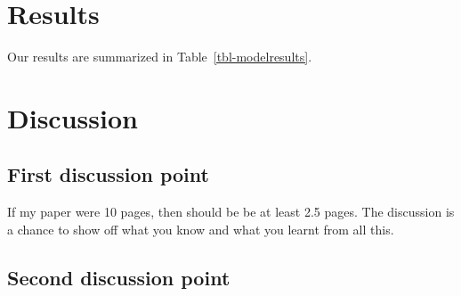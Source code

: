 \documentclass[
  letterpaper,
  DIV=11,
  numbers=noendperiod]{scrartcl}
\begin{document}
\section{Results}\label{results}

Our results are summarized in Table~\ref{tbl-modelresults}.

\begin{table}

\caption{\label{tbl-modelresults}}


\end{table}%

\section{Discussion}\label{discussion}

\subsection{First discussion point}\label{sec-first-point}

If my paper were 10 pages, then should be be at least 2.5 pages. The
discussion is a chance to show off what you know and what you learnt
from all this.

\subsection{Second discussion point}\label{second-discussion-point}
\end{document}
